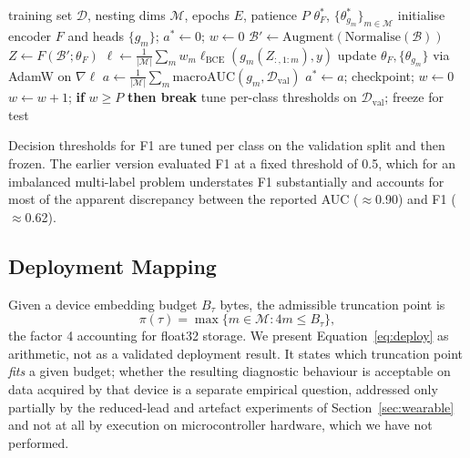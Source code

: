 \begin{algorithm}[!t]
\caption{MRL-ECG training}
\label{alg:train}
\begin{algorithmic}[1]
\Require training set $\mathcal{D}$, nesting dims $\mathcal{M}$, epochs $E$,
patience $P$
\Ensure $\theta_F^*$, $\{\theta_{g_m}^*\}_{m\in\mathcal{M}}$
\State initialise encoder $F$ and heads $\{g_m\}$; $a^* \gets 0$; $w \gets 0$
    \State $\mathcal{B}' \gets \mathrm{Augment}(\mathrm{Normalise}(\mathcal{B}))$
    \State $Z \gets F(\mathcal{B}'; \theta_F)$
    \State $\ell \gets \frac{1}{|\mathcal{M}|}\sum_{m} w_m
           \ell_{\mathrm{BCE}}(g_m(Z_{:,1:m}), y)$
    \State update $\theta_F, \{\theta_{g_m}\}$ via AdamW on $\nabla\ell$
  \EndFor
  \State $a \gets \frac{1}{|\mathcal{M}|}\sum_m
         \mathrm{macroAUC}(g_m, \mathcal{D}_{\mathrm{val}})$
    \State $a^* \gets a$; checkpoint; $w \gets 0$
  \Else
    \State $w \gets w+1$; \textbf{if} $w \ge P$ \textbf{then break}
  \EndIf
\EndFor
\State tune per-class thresholds on $\mathcal{D}_{\mathrm{val}}$; freeze for test
\end{algorithmic}
\end{algorithm}

Decision thresholds for F1 are tuned per class on the validation split and
then frozen. The earlier version evaluated F1 at a fixed threshold of 0.5,
which for an imbalanced multi-label problem understates F1 substantially and
accounts for most of the apparent discrepancy between the reported AUC
($\approx$0.90) and F1 ($\approx$0.62).

\subsection{Deployment Mapping}
\label{sec:deployment}

Given a device embedding budget $B_\tau$ bytes, the admissible truncation
point is
\begin{equation}
\pi(\tau) = \max\{m \in \mathcal{M} : 4m \le B_\tau\},
\label{eq:deploy}
\end{equation}
the factor 4 accounting for float32 storage. We present
Equation~\ref{eq:deploy} as arithmetic, not as a validated deployment
result. It states which truncation point \emph{fits} a given budget; whether
the resulting diagnostic behaviour is acceptable on data acquired by that
device is a separate empirical question, addressed only partially by the
reduced-lead and artefact experiments of Section~\ref{sec:wearable} and not at
all by execution on microcontroller hardware, which we have not performed.
